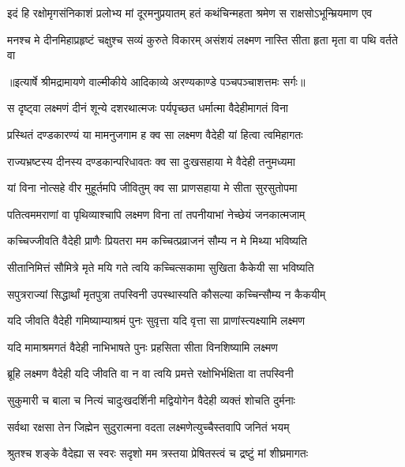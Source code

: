 \fourlineindentedshloka
{इदं हि रक्षोमृगसंनिकाशं}
{ प्रलोभ्य मां दूरमनुप्रयातम्}
{हतं कथंचिन्महता श्रमेण}
{ स राक्षसोऽभून्म्रियमाण एव} %

\fourlineindentedshloka
{मनश्च मे दीनमिहाप्रहृष्टं}
{ चक्षुश्च सव्यं कुरुते विकारम्}
{असंशयं लक्ष्मण नास्ति सीता}
{ हृता मृता वा पथि वर्तते वा} %


{॥इत्यार्षे श्रीमद्रामायणे वाल्मीकीये आदिकाव्ये अरण्यकाण्डे पञ्चपञ्चाशत्तमः सर्गः॥}


\twolineshloka
{स दृष्ट्वा लक्ष्मणं दीनं शून्ये दशरथात्मजः}
{पर्यपृच्छत धर्मात्मा वैदेहीमागतं विना} %

\twolineshloka
{प्रस्थितं दण्डकारण्यं या मामनुजगाम ह}
{क्व सा लक्ष्मण वैदेही यां हित्वा त्वमिहागतः} %

\twolineshloka
{राज्यभ्रष्टस्य दीनस्य दण्डकान्परिधावतः}
{क्व सा दुःखसहाया मे वैदेही तनुमध्यमा} %

\twolineshloka
{यां विना नोत्सहे वीर मुहूर्तमपि जीवितुम्}
{क्व सा प्राणसहाया मे सीता सुरसुतोपमा} %

\twolineshloka
{पतित्वममराणां वा पृथिव्याश्चापि लक्ष्मण}
{विना तां तपनीयाभां नेच्छेयं जनकात्मजाम्} %

\twolineshloka
{कच्चिज्जीवति वैदेही प्राणैः प्रियतरा मम}
{कच्चित्प्रव्राजनं सौम्य न मे मिथ्या भविष्यति} %

\twolineshloka
{सीतानिमित्तं सौमित्रे मृते मयि गते त्वयि}
{कच्चित्सकामा सुखिता कैकेयी सा भविष्यति} %

\twolineshloka
{सपुत्रराज्यां सिद्धार्थां मृतपुत्रा तपस्विनी}
{उपस्थास्यति कौसल्या कच्चिन्सौम्य न कैकयीम्} %

\twolineshloka
{यदि जीवति वैदेही गमिष्याम्याश्रमं पुनः}
{सुवृत्ता यदि वृत्ता सा प्राणांस्त्यक्ष्यामि लक्ष्मण} %

\twolineshloka
{यदि मामाश्रमगतं वैदेही नाभिभाषते}
{पुनः प्रहसिता सीता विनशिष्यामि लक्ष्मण} %

\twolineshloka
{ब्रूहि लक्ष्मण वैदेही यदि जीवति वा न वा}
{त्वयि प्रमत्ते रक्षोभिर्भक्षिता वा तपस्विनी} %

\twolineshloka
{सुकुमारी च बाला च नित्यं चादुःखदर्शिनी}
{मद्वियोगेन वैदेही व्यक्तं शोचति दुर्मनाः} %

\twolineshloka
{सर्वथा रक्षसा तेन जिह्मेन सुदुरात्मना}
{वदता लक्ष्मणेत्युच्चैस्तवापि जनितं भयम्} %

\twolineshloka
{श्रुतश्च शङ्के वैदेह्या स स्वरः सदृशो मम}
{त्रस्तया प्रेषितस्त्वं च द्रष्टुं मां शीघ्रमागतः} %

